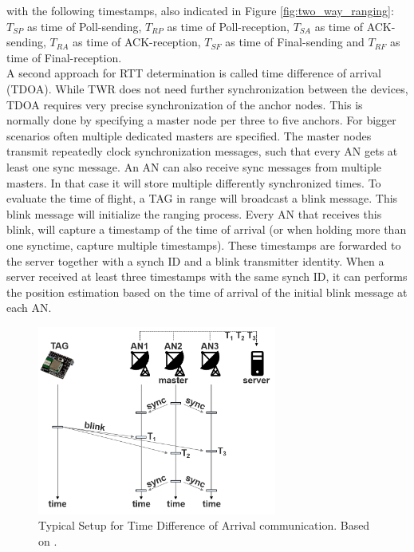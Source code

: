 with the following timestamps, also indicated in Figure \ref{fig:two_way_ranging}: $T_{SP}$ as time of Poll-sending, $T_{RP}$ as time of Poll-reception, $T_{SA}$ as time of ACK-sending, $T_{RA}$ as time of ACK-reception, $T_{SF}$ as time of Final-sending and $T_{RF}$ as time of Final-reception.\\
\noindent\hspace*{5mm}%
A second approach for RTT determination is called time difference of arrival (TDOA). While TWR does not need further synchronization between the devices, TDOA requires very precise synchronization of the anchor nodes. This is normally done by specifying a master node per three to five anchors. For bigger scenarios often multiple dedicated masters are specified. The master nodes transmit repeatedly clock synchronization messages, such that every AN gets at least one sync message. An AN can also receive sync messages from multiple masters. In that case it will store multiple differently synchronized times.
To evaluate the time of flight, a TAG in range will broadcast a blink message. This blink message will initialize the ranging process. Every AN that receives this blink, will capture a timestamp of the time of arrival (or when holding more than one synctime, capture multiple timestamps). These timestamps are forwarded to the server together with a synch ID and a blink transmitter identity. When a server received at least three timestamps with the same synch ID, it can performs the position estimation based on the time of arrival of the initial blink message at each AN.
\begin{figure}[th]
\centering
\includegraphics[width=0.7\textwidth]{Figures/time_difference_of_arrival}
\decoRule
\caption[Time Difference of Arrival]{Typical Setup for Time Difference of Arrival communication. Based on \cite{SewioTDOA}.}
\label{fig:time_difference_of_arrival}
\end{figure}
